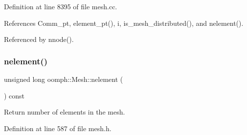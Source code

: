 Definition at line 8395 of file mesh.\+cc.



References Comm\+\_\+pt, element\+\_\+pt(), i, is\+\_\+mesh\+\_\+distributed(), and nelement().



Referenced by nnode().

\mbox{\label{classoomph_1_1Mesh_af01dfefb66c15579b540be62999d93ee}} 
\subsubsection{\texorpdfstring{nelement()}{nelement()}}
{\footnotesize\ttfamily unsigned long oomph\+::\+Mesh\+::nelement (\begin{DoxyParamCaption}{ }\end{DoxyParamCaption}) const\hspace{0.3cm}{\ttfamily [inline]}}



Return number of elements in the mesh. 



Definition at line 587 of file mesh.\+h.



